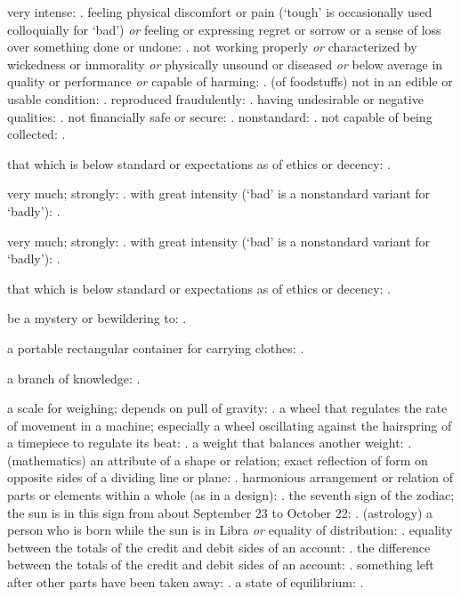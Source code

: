   very intense: . feeling physical discomfort or pain (`tough' is occasionally used colloquially for `bad') \textit{or} feeling or expressing regret or sorrow or a sense of loss over something done or undone: . not working properly \textit{or} characterized by wickedness or immorality \textit{or} physically unsound or diseased \textit{or} below average in quality or performance \textit{or} capable of harming: . (of foodstuffs) not in an edible or usable condition: . reproduced fraudulently: . having undesirable or negative qualities: . not financially safe or secure: . nonstandard: . not capable of being collected: .

  that which is below standard or expectations as of ethics or decency: .

  very much; strongly: . with great intensity (`bad' is a nonstandard variant for `badly'): .

  very much; strongly: . with great intensity (`bad' is a nonstandard variant for `badly'): .

  that which is below standard or expectations as of ethics or decency: .

  be a mystery or bewildering to: .

  a portable rectangular container for carrying clothes: .

  a branch of knowledge: .

  a scale for weighing; depends on pull of gravity: . a wheel that regulates the rate of movement in a machine; especially a wheel oscillating against the hairspring of a timepiece to regulate its beat: . a weight that balances another weight: . (mathematics) an attribute of a shape or relation; exact reflection of form on opposite sides of a dividing line or plane: . harmonious arrangement or relation of parts or elements within a whole (as in a design): . the seventh sign of the zodiac; the sun is in this sign from about September 23 to October 22: . (astrology) a person who is born while the sun is in Libra \textit{or} equality of distribution: . equality between the totals of the credit and debit sides of an account: . the difference between the totals of the credit and debit sides of an account: . something left after other parts have been taken away: . a state of equilibrium: .

